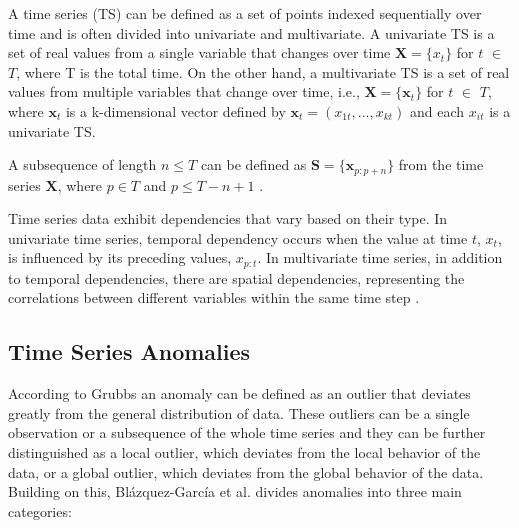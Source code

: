 A time series (TS) can be defined as a set of points indexed sequentially over time and is often divided into univariate and multivariate. A univariate TS is a set of real values from a single variable that changes over time $\textbf{X} = \{x_t\}$ for $t$ $\in$ $T$, where T is the total time. On the other hand, a multivariate TS is a set of real values from multiple variables that change over time, i.e., $\textbf{X} = \{\textbf{x}_t\}$ for $t$ $\in$ $T$, where $\textbf{x}_t$ is a k-dimensional vector defined by $\textbf{x}_t = (x_{1t}, ..., x_{kt})$ and each $x_{it}$ is a univariate TS. 

A subsequence of length $n \leq T$ can be defined as $\textbf{S} = \{\textbf{x}_{p:p+n}\}$ from the time series $\textbf{X}$, where $p \in T$ and $p \leq T-n+1$ \cite{Blazquez-Garcia_Conde_Mori_Lozano_2021}. 

Time series data exhibit dependencies that vary based on their type. In univariate time series, temporal dependency occurs when the value at time $t$, $x_t$, is influenced by its preceding values, $x_{p:t}$. In multivariate time series, in addition to temporal dependencies, there are spatial dependencies, representing the correlations between different variables within the same time step \cite{Zamanzadeh_Darban_Webb_Pan_Aggarwal_Salehi_2024}.

\subsection{Time Series Anomalies}

According to Grubbs \cite{Grubbs_1969} an anomaly can be defined as an outlier that deviates greatly from the general distribution of data. These outliers can be a single observation or a subsequence of the whole time series and they can be further distinguished as a local outlier, which deviates from the local behavior of the data, or a global outlier, which deviates from the global behavior of the data. Building on this, Blázquez-García et al. \cite{Blazquez-Garcia_Conde_Mori_Lozano_2021} divides anomalies into three main categories:

